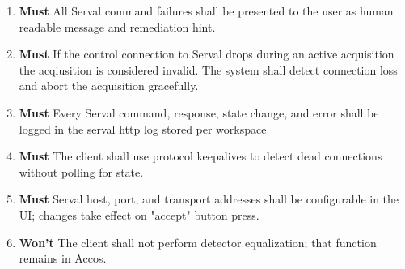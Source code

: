 \documentclass[10pt]{article}
\newcommand{\PriorityTag}[2]{%
    \colorbox{#2!25}{\footnotesize\textsf{\textbf{#1}}}\hspace{0.6em}}
\newcommand{\must}{\leavevmode\PriorityTag{Must}{green}}
\newcommand{\wont}{\leavevmode\PriorityTag{Won't}{red}}
\newcounter{reqgrp}[section] %
\newcounter{reqno}
\newcommand{\reqprefix}{GEN}
\newenvironment{requirements}[1]{%
    \renewcommand{\reqprefix}{#1}%
    \refstepcounter{reqgrp}%
    \setcounter{reqno}{0}%
    \begin{enumerate}[leftmargin=*]
    }{\end{enumerate}}
\begin{document}
\begin{requirements}{SRV}
        \item \must {}
        {All Serval command failures shall be presented to the user as human readable message and remediation hint.}

        \item \must {}
        {If the control connection to Serval drops during an active acquisition the acqiusition is considered invalid. The system shall detect connection loss and abort the acquisition gracefully.}

        \item \must {}
        {Every Serval command, response, state change, and error shall be logged in the serval http log stored per workspace}

        \item \must {}
        {The client shall use protocol keepalives to detect dead connections without polling for state.}

        \item \must {}
        {Serval host, port, and transport addresses shall be configurable in the UI; changes take effect on "accept" button press.}

        \item \wont {}
        {The client shall not perform detector equalization; that function remains in Accos.}


\end{requirements}
\end{document}
